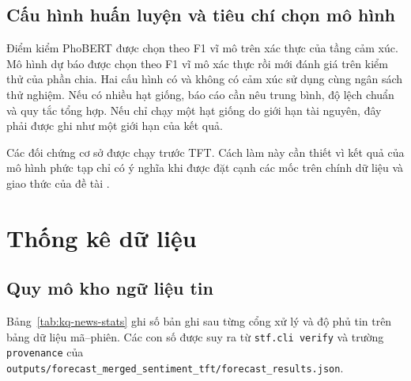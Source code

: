 \subsection{Cấu hình huấn luyện và tiêu chí chọn mô hình}

Điểm kiểm PhoBERT được chọn theo F1 vĩ mô trên xác thực của tầng cảm xúc. Mô hình
dự báo được chọn theo F1 vĩ mô xác thực rồi mới đánh giá trên kiểm thử của phần chia. Hai cấu
hình có và không có cảm xúc sử dụng cùng ngân sách thử nghiệm. Nếu có nhiều hạt giống,
báo cáo cần nêu trung bình, độ lệch chuẩn và quy tắc tổng hợp. Nếu chỉ chạy một hạt giống do
giới hạn tài nguyên, đây phải được ghi như một giới hạn của kết quả.

Các đối chứng cơ sở được chạy trước TFT. Cách làm này cần thiết vì kết quả của mô hình phức
tạp chỉ có ý nghĩa khi được đặt cạnh các mốc trên chính dữ liệu và giao thức của đề tài
\cite{Feng2018_181009936v2,Chen2021_210708721v1}.

\section{Thống kê dữ liệu}
\label{sec:kq-data}

\subsection{Quy mô kho ngữ liệu tin}

Bảng~\ref{tab:kq-news-stats} ghi số bản ghi sau từng cổng xử lý và độ phủ tin trên bảng
dữ liệu mã--phiên. Các con số được suy ra từ \texttt{stf.cli verify} và trường
\texttt{provenance} của \texttt{outputs/forecast\_merged\_sentiment\_tft/forecast\_results.json}.

